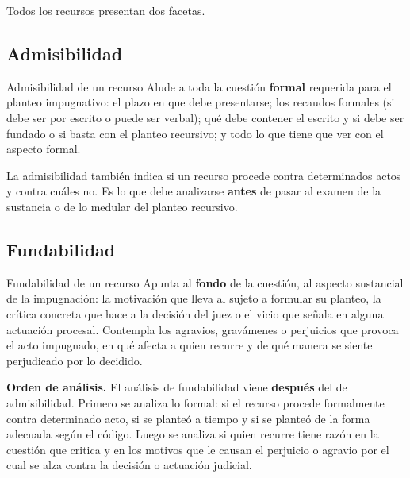 \documentclass[12pt,oneside]{book}
\begin{document}
Todos los recursos presentan dos facetas.

\subsection{Admisibilidad}

\begin{definition}{Admisibilidad de un recurso}
Alude a toda la cuestión \textbf{formal} requerida para el planteo impugnativo: el plazo en que debe presentarse; los recaudos formales (si debe ser por escrito o puede ser verbal); qué debe contener el escrito y si debe ser fundado o si basta con el planteo recursivo; y todo lo que tiene que ver con el aspecto formal.
\end{definition}

La admisibilidad también indica si un recurso procede contra determinados actos y contra cuáles no. Es lo que debe analizarse \textbf{antes} de pasar al examen de la sustancia o de lo medular del planteo recursivo.

\subsection{Fundabilidad}

\begin{definition}{Fundabilidad de un recurso}
Apunta al \textbf{fondo} de la cuestión, al aspecto sustancial de la impugnación: la motivación que lleva al sujeto a formular su planteo, la crítica concreta que hace a la decisión del juez o el vicio que señala en alguna actuación procesal. Contempla los agravios, gravámenes o perjuicios que provoca el acto impugnado, en qué afecta a quien recurre y de qué manera se siente perjudicado por lo decidido.
\end{definition}

\begin{important}
\textbf{Orden de análisis.} El análisis de fundabilidad viene \textbf{después} del de admisibilidad. Primero se analiza lo formal: si el recurso procede formalmente contra determinado acto, si se planteó a tiempo y si se planteó de la forma adecuada según el código. Luego se analiza si quien recurre tiene razón en la cuestión que critica y en los motivos que le causan el perjuicio o agravio por el cual se alza contra la decisión o actuación judicial.
\end{important}
\end{document}
